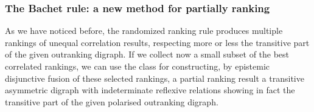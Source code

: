 \documentclass[a4paper,12pt,english]{sphinxhowto}
\begin{document}
\subsubsection{The Bachet rule: a new method for partially ranking}
\label{\detokenize{pearls:the-bachet-rule-a-new-method-for-partially-ranking}}
\sphinxAtStartPar
As we have noticed before, the randomized  ranking rule produces multiple rankings of unequal correlation results, respecting more or less the transitive part of the given outranking digraph. If we collect now a small subset of the best correlated rankings, we can use the  class for constructing, by epistemic disjunctive fusion of these selected rankings, a partial  ranking result \textendash{}a transitive asymmetric digraph with indeterminate reflexive relations\textendash{} showing in fact the transitive part of the given polarised outranking digraph.
\end{document}
